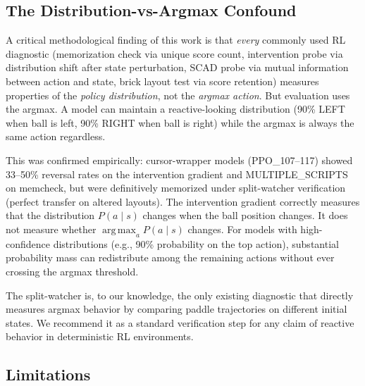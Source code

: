 \documentclass[11pt]{article}
\DeclareMathOperator{\argmax}{arg\,max}
\begin{document}
\subsection{The Distribution-vs-Argmax Confound}

A critical methodological finding of this work is that \emph{every} commonly
used RL diagnostic (memorization check via unique score count, intervention
probe via distribution shift after state perturbation, SCAD probe via mutual
information between action and state, brick layout test via score
retention) measures properties of the \emph{policy distribution}, not the
\emph{argmax action}. But evaluation uses the argmax. A model can maintain a
reactive-looking distribution (90\% LEFT when ball is left, 90\% RIGHT when
ball is right) while the argmax is always the same action regardless.

This was confirmed empirically: cursor-wrapper models (PPO\_107--117)
showed 33--50\% reversal rates on the intervention gradient and MULTIPLE\_SCRIPTS on
memcheck, but were definitively memorized under split-watcher verification
(perfect transfer on altered layouts). The intervention gradient correctly
measures that the distribution $P(a \mid s)$ changes when the ball position
changes. It does not measure whether $\argmax_a P(a \mid s)$ changes. For
models with high-confidence distributions (e.g., 90\% probability on the
top action), substantial probability mass can redistribute among the remaining
actions without ever crossing the argmax threshold.

The split-watcher is, to our knowledge, the only existing diagnostic that
directly measures argmax behavior by comparing paddle trajectories on different
initial states. We recommend it as a standard verification step for any claim
of reactive behavior in deterministic RL environments.

\subsection{Limitations}
\end{document}
